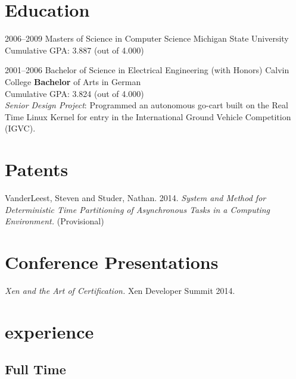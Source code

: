 \documentclass[print]{template/friggeri-cv} %
\begin{document}
\section{Education}

\begin{entrylist}

\entry
{2006--2009}
{Masters {\normalfont of Science in Computer Science}}
{Michigan State University}
{Cumulative GPA:  3.887 (out of 4.000)}

\entry
{2001--2006}
{Bachelor {\normalfont of Science in Electrical Engineering (with Honors)}}
{Calvin College}
{\textbf{Bachelor} of Arts in German \\
Cumulative GPA:  3.824 (out of 4.000) \\
\emph{Senior Design Project}: Programmed an autonomous go-cart built on the Real
Time Linux Kernel for entry in the International Ground Vehicle Competition (IGVC).}

\end{entrylist}


\section{Patents}
VanderLeest, Steven and Studer, Nathan.  2014.  \emph{System and Method for Deterministic Time Partitioning of Asynchronous Tasks in a Computing Environment.} (Provisional)

\section{Conference Presentations}
\emph{Xen and the Art of Certification.}  Xen Developer Summit 2014.

\section{experience}

\subsection{Full Time}
\end{document}
